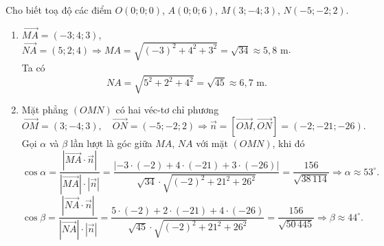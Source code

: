 \begin{bt}
{\begin{center}
		\end{center}
		Cho  biết toạ độ các điểm
		$ 
		O(0;0;0)$,  $ A(0;0;6)$, $ M(3;-4;3)$, $ N(-5;-2;2)$.
		\begin{enumerate}
			\item  $
			\overrightarrow{MA} = (-3;4;3)$,  $\overrightarrow{NA} = (5;2;4)
			\Rightarrow  MA = \sqrt{(-3)^2 + 4^2 + 3^2} = \sqrt{34} \approx 5{,}8\text{ m}
			$.\\ 
			Ta  có
			 $$
			NA = \sqrt{5^2 + 2^2 + 4^2} = \sqrt{45}  \approx 6{,}7\text{ m}.
			 $$
			\item Mặt phẳng $(OMN)$ có hai véc-tơ  chỉ phương
			 $$
			\overrightarrow{OM} = (3;-4;3),\quad \overrightarrow{ON} =  (-5;-2;2)
			\Rightarrow \overrightarrow{n} = \left[\overrightarrow{OM},  \overrightarrow{ON}\right] = (-2; -21; -26).
			 $$
			Gọi $\alpha$  và $\beta$ lần lượt là góc giữa $MA$, $NA$ với mặt $(OMN)$, khi đó
			 $$
			\cos\alpha = \dfrac{\left|\overrightarrow{MA}  \cdot \overrightarrow{n}\right|}{\left|\overrightarrow{MA}\right|\cdot \left|\overrightarrow{n}\right|} =
			\dfrac{\left|-3 \cdot (-2) + 4 \cdot (-21) + 3 \cdot (-26)\right|}{\sqrt{34}  \cdot \sqrt{(-2)^2 + 21^2 + 26^2}} = \dfrac{156}{\sqrt{38\, 114}}
			\Rightarrow \alpha \approx  53^\circ.
			$$ 
			 $$
			\cos\beta =  \dfrac{\left|\overrightarrow{NA} \cdot \overrightarrow{n}\right|}{\left|\overrightarrow{NA}\right|\cdot \left|\overrightarrow{n}\right|} =
			\dfrac{5 \cdot (-2) +  2 \cdot (-21) + 4 \cdot (-26)}{\sqrt{45} \cdot \sqrt{(-2)^2 + 21^2 + 26^2}} = \dfrac{156}{\sqrt{50\,445}} \Rightarrow \beta \approx 44^\circ.
			$$ 
		\end{enumerate}
	} 
\end{bt}


